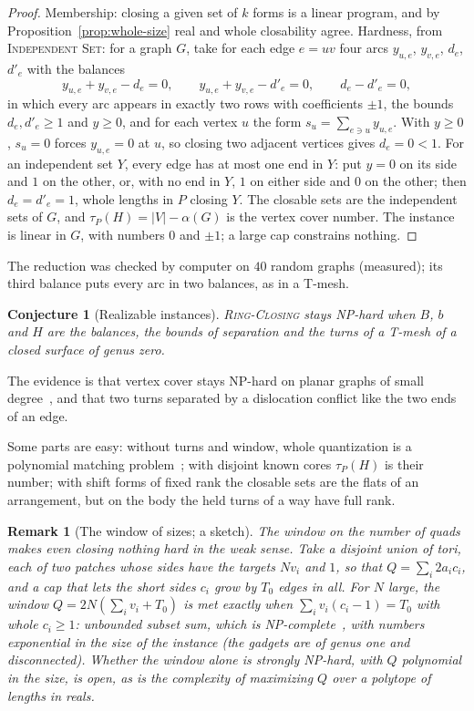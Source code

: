 \documentclass[11pt,a4paper]{article}
\newtheorem{remark}{Remark}
\newtheorem{conjecture}{Conjecture}
\newcommand{\shift}{s}
\newcommand{\RC}{\textup{\textsc{Ring-Closing}}}
\begin{document}
\begin{proof}
Membership: closing a given set of $k$ forms is a linear program, and by
Proposition~\ref{prop:whole-size} real and whole closability agree. Hardness,
from \textup{\textsc{Independent Set}}: for a graph $G$, take for each edge $e
= uv$ four arcs $y_{u,e}$, $y_{v,e}$, $d_e$, $d'_e$ with the balances
\[
  y_{u,e} + y_{v,e} - d_e = 0, \qquad y_{u,e} + y_{v,e} - d'_e = 0, \qquad
  d_e - d'_e = 0 ,
\]
in which every arc appears in exactly two rows with coefficients $\pm1$, the
bounds $d_e, d'_e \ge 1$ and $y \ge 0$, and for each vertex $u$ the form
$\shift_u = \sum_{e \ni u} y_{u,e}$. With $y \ge 0$, $\shift_u = 0$ forces
$y_{u,e} = 0$ at $u$, so closing two adjacent vertices gives $d_e = 0 < 1$.
For an independent set $Y$, every edge has at most one end in $Y$: put $y = 0$
on its side and $1$ on the other, or, with no end in $Y$, $1$ on either side
and $0$ on the other; then $d_e = d'_e = 1$, whole lengths in $P$ closing $Y$.
The closable sets are the independent sets of $G$, and $\tau_P(H) = |V| -
\alpha(G)$ is the vertex cover number. The instance is linear in $G$, with
numbers $0$ and $\pm1$; a large cap constrains nothing.
\end{proof}

The reduction was checked by computer on $40$ random graphs (measured); its
third balance puts every arc in two balances, as in a T-mesh.

\begin{conjecture}[Realizable instances]\label{conj:realize}
\RC{} stays NP-hard when $B$, $b$ and $H$ are the balances, the bounds of
separation and the turns of a T-mesh of a closed surface of genus zero.
\end{conjecture}

The evidence is that vertex cover stays NP-hard on planar graphs of small
degree~\cite{garey1976simplified}, and that two turns separated by a
dislocation conflict like the two ends of an edge.

Some parts are easy: without turns and window, whole quantization is a
polynomial matching problem~\cite{edmonds1970matching}; with disjoint known
cores $\tau_P(H)$ is their number; with shift forms of fixed rank the closable
sets are the flats of an arrangement, but on the body the held turns of a way
have full rank.

\begin{remark}[The window of sizes; a sketch]
The window on the number of quads makes even closing nothing hard in the weak
sense. Take a disjoint union of tori, each of two patches whose sides have the
targets $N v_i$ and $1$, so that $Q = \sum_i 2 a_i c_i$, and a cap that lets the
short sides $c_i$ grow by $T_0$ edges in all. For $N$ large, the window $Q =
2N(\sum_i v_i + T_0)$ is met exactly when $\sum_i v_i(c_i - 1) = T_0$ with
whole $c_i \ge 1$: unbounded subset sum, which is
NP-complete~\cite{lueker1975two}, with numbers exponential in the size of the
instance (the gadgets are of genus one and disconnected). Whether the window
alone is strongly NP-hard, with $Q$ polynomial in the size, is open, as is the
complexity of maximizing $Q$ over a polytope of lengths in reals.
\end{remark}
\end{document}
